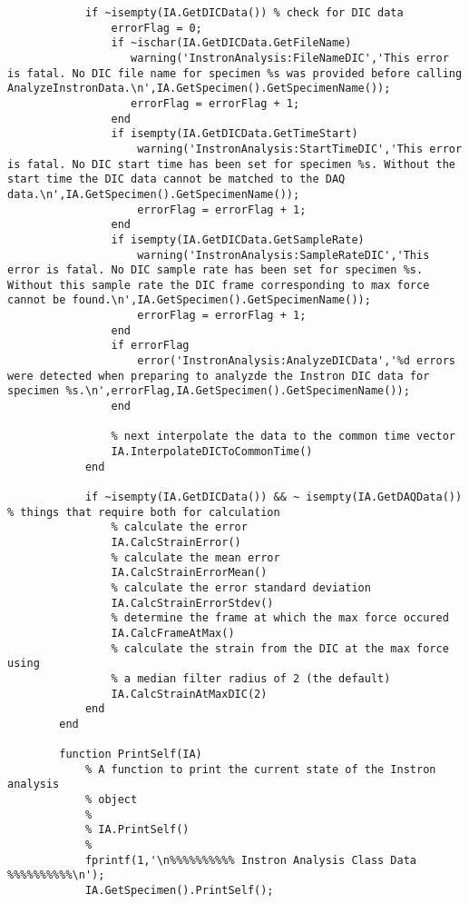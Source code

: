 \begin{lstlisting}
            if ~isempty(IA.GetDICData()) % check for DIC data
                errorFlag = 0;
                if ~ischar(IA.GetDICData.GetFileName)
                   warning('InstronAnalysis:FileNameDIC','This error is fatal. No DIC file name for specimen %s was provided before calling AnalyzeInstronData.\n',IA.GetSpecimen().GetSpecimenName());
                   errorFlag = errorFlag + 1;
                end
                if isempty(IA.GetDICData.GetTimeStart)
                    warning('InstronAnalysis:StartTimeDIC','This error is fatal. No DIC start time has been set for specimen %s. Without the start time the DIC data cannot be matched to the DAQ data.\n',IA.GetSpecimen().GetSpecimenName());
                    errorFlag = errorFlag + 1;
                end
                if isempty(IA.GetDICData.GetSampleRate)
                    warning('InstronAnalysis:SampleRateDIC','This error is fatal. No DIC sample rate has been set for specimen %s. Without this sample rate the DIC frame corresponding to max force cannot be found.\n',IA.GetSpecimen().GetSpecimenName());
                    errorFlag = errorFlag + 1;
                end
                if errorFlag
                    error('InstronAnalysis:AnalyzeDICData','%d errors were detected when preparing to analyzde the Instron DIC data for specimen %s.\n',errorFlag,IA.GetSpecimen().GetSpecimenName());
                end
                               
                % next interpolate the data to the common time vector
                IA.InterpolateDICToCommonTime()
            end
            
            if ~isempty(IA.GetDICData()) && ~ isempty(IA.GetDAQData()) % things that require both for calculation
                % calculate the error
                IA.CalcStrainError()
                % calculate the mean error
                IA.CalcStrainErrorMean()
                % calculate the error standard deviation
                IA.CalcStrainErrorStdev()
                % determine the frame at which the max force occured
                IA.CalcFrameAtMax()
                % calculate the strain from the DIC at the max force using
                % a median filter radius of 2 (the default)
                IA.CalcStrainAtMaxDIC(2)
            end
        end

        function PrintSelf(IA)
            % A function to print the current state of the Instron analysis
            % object
            %
            % IA.PrintSelf()
            %
            fprintf(1,'\n%%%%%%%%%% Instron Analysis Class Data %%%%%%%%%%\n');
            IA.GetSpecimen().PrintSelf();
            

\end{lstlisting}
